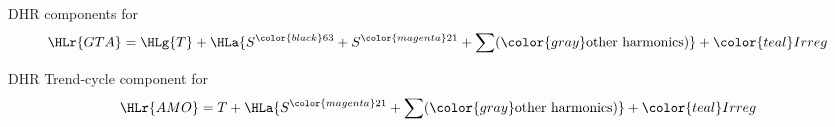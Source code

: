 \begin{slide}
  \begin{block}{DHR components for \GTA}
    \centering
  \begin{displaymath}
    \HLr{GTA}=\HLg{T}+\HLa{S^{\color{black}63}+S^{\color{magenta}21}+\sum ({\color{gray}\text{other harmonics}})}+{\color{teal}Irreg}
  \end{displaymath}
  \end{block}
\end{slide}

\begin{slide}
  \begin{block}{DHR Trend-cycle component for \AMO}
    \centering
    \begin{displaymath}
      \HLr{AMO}=T+\HLa{S^{\color{magenta}21}+\sum ({\color{gray}\text{other harmonics}})}+{\color{teal}Irreg}
    \end{displaymath}
  \end{block}
\end{slide}


